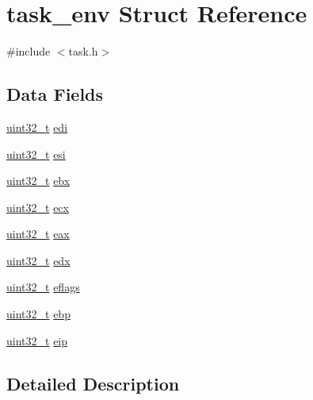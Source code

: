 \hypertarget{structtask__env}{\section{task\+\_\+env Struct Reference}
\label{structtask__env}
}


{\ttfamily \#include $<$task.\+h$>$}

\subsection*{Data Fields}
\begin{DoxyCompactItemize}
\item 
\hyperlink{aplus_8h_a53a0df51603c77c2aa5b9ea61b606a82}{uint32\+\_\+t} \hyperlink{structtask__env_afd28f73e49aab123e4c2a5f149f10fe2}{edi}
\item 
\hyperlink{aplus_8h_a53a0df51603c77c2aa5b9ea61b606a82}{uint32\+\_\+t} \hyperlink{structtask__env_a4bae98183ee224f67097a00d887a229b}{esi}
\item 
\hyperlink{aplus_8h_a53a0df51603c77c2aa5b9ea61b606a82}{uint32\+\_\+t} \hyperlink{structtask__env_a8594000ef53ff5bb74343e54648fd5e1}{ebx}
\item 
\hyperlink{aplus_8h_a53a0df51603c77c2aa5b9ea61b606a82}{uint32\+\_\+t} \hyperlink{structtask__env_a069a27e98e74717519066b7e73e9bc0e}{ecx}
\item 
\hyperlink{aplus_8h_a53a0df51603c77c2aa5b9ea61b606a82}{uint32\+\_\+t} \hyperlink{structtask__env_a617049724b4b79278b4fe107d9df7e3e}{eax}
\item 
\hyperlink{aplus_8h_a53a0df51603c77c2aa5b9ea61b606a82}{uint32\+\_\+t} \hyperlink{structtask__env_ab76a643115c795f2f9feb5582ea29497}{edx}
\item 
\hyperlink{aplus_8h_a53a0df51603c77c2aa5b9ea61b606a82}{uint32\+\_\+t} \hyperlink{structtask__env_a1eeaac73d44a6550af32a9dd726935e5}{eflags}
\item 
\hyperlink{aplus_8h_a53a0df51603c77c2aa5b9ea61b606a82}{uint32\+\_\+t} \hyperlink{structtask__env_a6630718bd69f6876f2ff74299316ae47}{ebp}
\item 
\hyperlink{aplus_8h_a53a0df51603c77c2aa5b9ea61b606a82}{uint32\+\_\+t} \hyperlink{structtask__env_ae6f3defc8a0fe9512785fdfd2eedd07d}{eip}
\end{DoxyCompactItemize}


\subsection{Detailed Description}


